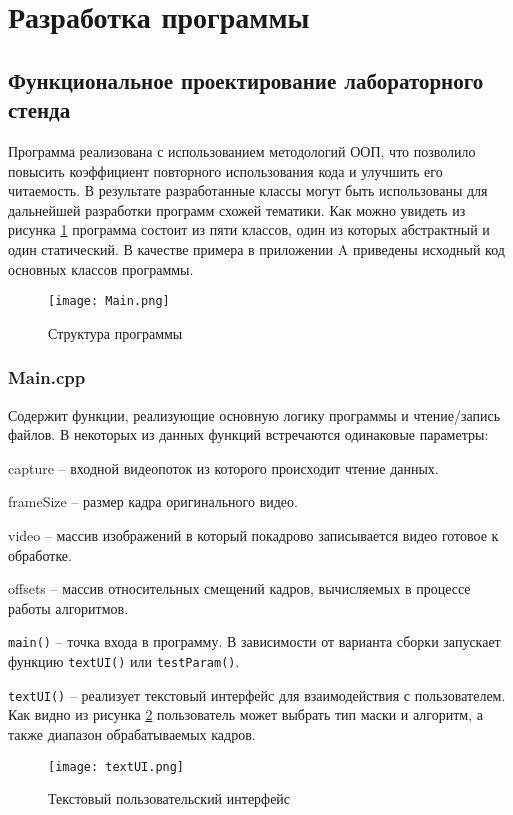 \section{Разработка программы}
\subsection{Функциональное проектирование лабораторного стенда}
Программа реализована с использованием методологий ООП, что позволило повысить коэффициент повторного использования кода и улучшить его читаемость. В результате разработанные классы могут быть использованы для дальнейшей разработки программ схожей тематики. Как можно увидеть из рисунка \ref{fig:uml} программа состоит из пяти классов, один из которых абстрактный и один статический. В качестве примера в приложении A приведены исходный код основных классов программы.
\begin{figure}[h]
    \centering   
    \texttt{[image: Main.png]} 
    \caption{Структура программы}
    \label{fig:uml}
\end{figure} 

\subsubsection{Main.cpp~}
Содержит функции, реализующие основную логику программы и чтение/запись файлов. В некоторых из данных функций встречаются одинаковые параметры:

capture -- входной видеопоток из которого происходит чтение данных.

frameSize -- размер кадра оригинального видео.

video -- массив изображений в который покадрово записывается видео готовое к обработке.

offsets -- массив относительных смещений кадров, вычисляемых в процессе работы алгоритмов.

\texttt{main()} -- точка входа в программу. В зависимости от варианта сборки запускает функцию \texttt{textUI()} или \texttt{testParam()}.

\texttt{textUI()} -- реализует текстовый интерфейс для взаимодействия с пользователем. Как видно из рисунка \ref{fig:textUI} пользователь может выбрать тип маски и алгоритм, а также диапазон обрабатываемых кадров.
\begin{figure}[h]
    \centering   
    \texttt{[image: textUI.png]} 
    \caption{Текстовый пользовательский интерфейс}
    \label{fig:textUI}
\end{figure} 

